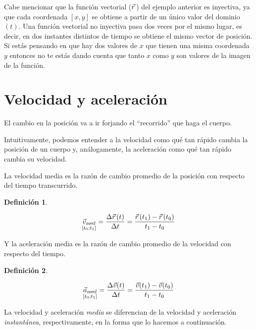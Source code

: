 \documentclass[a5paper,12pt,twoside]{book}
\newtheorem{defn}{{Definición}}[chapter]
\begin{document}
Cabe mencionar que la función vectorial ($\xyz$) del ejemplo anterior es inyectiva, ya que cada coordenada $[x,y]$ se obtiene a partir de un único valor del dominio $(t)$.
Una función vectorial no inyectiva pasa dos veces por el mismo lugar, es decir, en dos instantes distintos de tiempo se obtiene el mismo vector de posición.
Si estás pensando en que hay dos valores de $x$ que tienen una misma coordenada $y$ entonces no te estás dando cuenta que tanto $x$ como $y$ son valores de la imagen de la función.


\section{Velocidad y aceleración}

El cambio en la posición va a ir forjando el ``recorrido'' que haga el cuerpo.

Intuitivamente, podemos entender a la velocidad como qué tan rápido cambia la posición de un cuerpo y, análogamente, la aceleración como qué tan rápido cambia su velocidad.

La velocidad media es la razón de cambio promedio de la posición con respecto del tiempo transcurrido.

\begin{mdframed}[style=MyFrame1]
    \begin{defn}
    \end{defn}
    \begin{equation*}
        \media{\Vec{v}}{\left[ t_0 ; t_1 \right]}
      = \dfrac{\Delta \xyz(t)}{\Delta t}
      = \dfrac{\xyz(t_1)-\xyz(t_0)}{t_1-t_0}
    \end{equation*}
\end{mdframed}

Y la aceleración media es la razón de cambio promedio de la velocidad con respecto del tiempo.

\begin{mdframed}[style=MyFrame1]
    \begin{defn}
    \end{defn}
    \begin{equation*}
        \media{\Vec{a}}{\left[ t_0 ; t_1 \right]}
      = \dfrac{\Delta \Vec{v}(t)}{\Delta t}
      = \dfrac{\Vec{v}(t_1)-\Vec{v}(t_0)}{t_1-t_0}
    \end{equation*}
\end{mdframed}

La velocidad y aceleración \emph{media} se diferencian de la velocidad y aceleración \emph{instantánea}, respectivamente, en la forma que lo hacemos a continuación.
\end{document}
